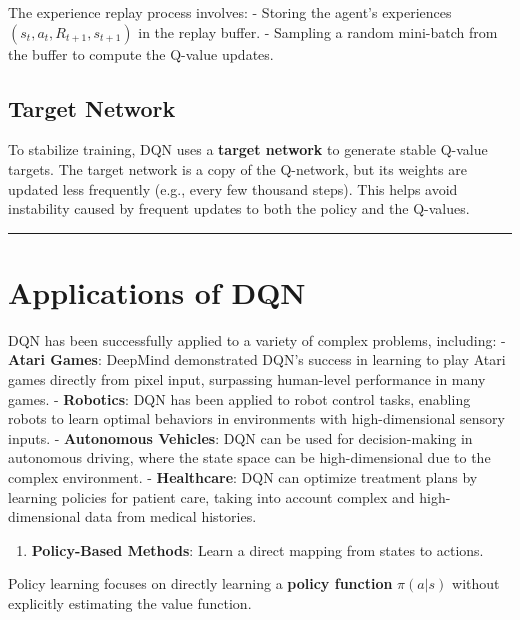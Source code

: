 \documentclass[
]{book}
\providecommand{\tightlist}{%
  \setlength{\itemsep}{0pt}\setlength{\parskip}{0pt}}
\begin{document}
The experience replay process involves:
- Storing the agent's experiences \((s_t, a_t, R_{t+1}, s_{t+1})\) in the replay buffer.
- Sampling a random mini-batch from the buffer to compute the Q-value updates.

\subsection{Target Network}\label{target-network}

To stabilize training, DQN uses a \textbf{target network} to generate stable Q-value targets. The target network is a copy of the Q-network, but its weights are updated less frequently (e.g., every few thousand steps). This helps avoid instability caused by frequent updates to both the policy and the Q-values.

\begin{center}\rule{0.5\linewidth}{0.5pt}\end{center}

\section{Applications of DQN}\label{applications-of-dqn}

DQN has been successfully applied to a variety of complex problems, including:
- \textbf{Atari Games}: DeepMind demonstrated DQN's success in learning to play Atari games directly from pixel input, surpassing human-level performance in many games.
- \textbf{Robotics}: DQN has been applied to robot control tasks, enabling robots to learn optimal behaviors in environments with high-dimensional sensory inputs.
- \textbf{Autonomous Vehicles}: DQN can be used for decision-making in autonomous driving, where the state space can be high-dimensional due to the complex environment.
- \textbf{Healthcare}: DQN can optimize treatment plans by learning policies for patient care, taking into account complex and high-dimensional data from medical histories.

\begin{enumerate}
\def\labelenumi{\arabic{enumi}.}
\setcounter{enumi}{1}
\tightlist
\item
  \textbf{Policy-Based Methods}: Learn a direct mapping from states to actions.
\end{enumerate}

Policy learning focuses on directly learning a \textbf{policy function} \(\pi(a | s)\) without explicitly estimating the value function.
\end{document}
